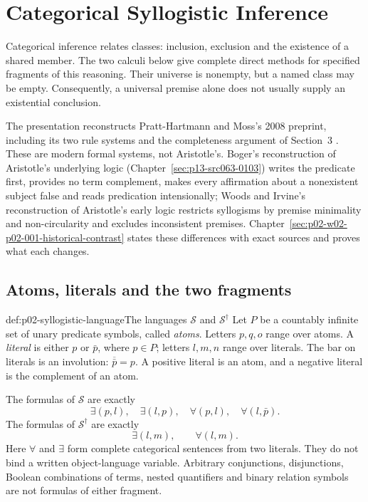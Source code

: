 \chapter{Categorical Syllogistic Inference}
\label{sec:p02-syllogistic-inference}

Categorical inference relates classes: inclusion, exclusion and the existence
of a shared member. The two calculi below give complete direct methods for
specified fragments of this reasoning. Their universe is nonempty, but a
named class may be empty. Consequently, a universal premise alone does not
usually supply an existential conclusion.

The presentation reconstructs Pratt-Hartmann and Moss's 2008 preprint,
including its two rule systems and the completeness argument of Section~3
\cite[pp.~3--18]{PrattHartmannMoss2008SyllogisticV1}.
These are modern formal systems, not Aristotle's. Boger's reconstruction of
Aristotle's underlying logic (Chapter~\ref{sec:p13-src063-0103}) writes the
predicate first, provides no term complement, makes every affirmation about a
nonexistent subject false and reads predication intensionally; Woods and
Irvine's reconstruction of Aristotle's early logic
\cite[pp.~54--56, 64--65]{WoodsIrvine2004EarlyLogic} restricts syllogisms by
premise minimality and non-circularity and excludes inconsistent premises.
Chapter~\ref{sec:p02-w02-p02-001-historical-contrast} states these
differences with exact sources and proves what each changes.

\section{Atoms, literals and the two fragments}

\begin{hbdefinition}{def:p02-syllogistic-language}{The languages \(\mathcal S\) and \(\mathcal S^\dagger\)}
Let \(P\) be a countably infinite set of unary predicate symbols, called
\emph{atoms}. Letters \(p,q,o\) range over atoms. A \emph{literal} is either
\(p\) or \(\bar p\), where \(p\in P\); letters \(l,m,n\) range over literals.
The bar on literals is an involution: \(\overline{\bar p}=p\).
A positive literal is an atom, and a negative literal is the complement of
an atom.

The formulas of \(\mathcal S\) are exactly
\[
 \exists(p,l),\quad \exists(l,p),\quad
 \forall(p,l),\quad \forall(l,\bar p).
\]
The formulas of \(\mathcal S^\dagger\) are exactly
\[
 \exists(l,m),\qquad \forall(l,m).
\]
Here \(\forall\) and \(\exists\) form complete categorical sentences from
two literals. They do not bind a written object-language variable. Arbitrary
conjunctions, disjunctions, Boolean combinations of terms, nested quantifiers
and binary relation symbols are not formulas of either fragment.
\end{hbdefinition}


